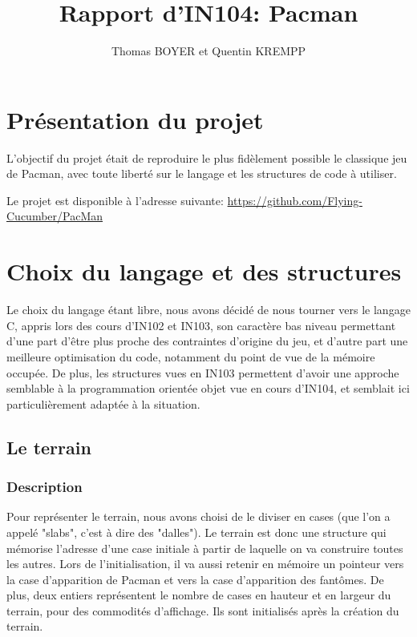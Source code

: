 \documentclass[a4paper,11pt]{article}
\begin{document}
\title{Rapport d'IN104: Pacman}
\author{Thomas BOYER et Quentin KREMPP}
\maketitle

\tableofcontents

\section{Présentation du projet}

    L'objectif du projet était de reproduire le plus fidèlement possible le classique jeu de Pacman, avec toute liberté sur le langage et les structures de code à utiliser.
    
    Le projet est disponible à l'adresse suivante: \url{https://github.com/Flying-Cucumber/PacMan}

\section{Choix du langage et des structures}

    Le choix du langage étant libre, nous avons décidé de nous tourner vers le langage C, appris lors des cours d'IN102 et IN103, son caractère bas niveau permettant d'une part d'être plus proche des contraintes d'origine du jeu, et d'autre part une meilleure optimisation du code, notamment du point de vue de la mémoire occupée. De plus, les structures vues en IN103 permettent d'avoir une approche semblable à la programmation orientée objet vue en cours d'IN104, et semblait ici particulièrement adaptée à la situation.

    \subsection{Le terrain}

    \subsubsection{Description}

    Pour représenter le terrain, nous avons choisi de le diviser en cases (que l'on a appelé "slabs", c'est à dire des "dalles"). Le terrain est donc une structure qui mémorise l'adresse d'une case initiale à partir de laquelle on va construire toutes les autres. Lors de l'initialisation, il va aussi retenir en mémoire un pointeur vers la case d'apparition de Pacman et vers la case d'apparition des fantômes. De plus, deux entiers représentent le nombre de cases en hauteur et en largeur du terrain, pour des commodités d'affichage. Ils sont initialisés après la création du terrain.
\end{document}
